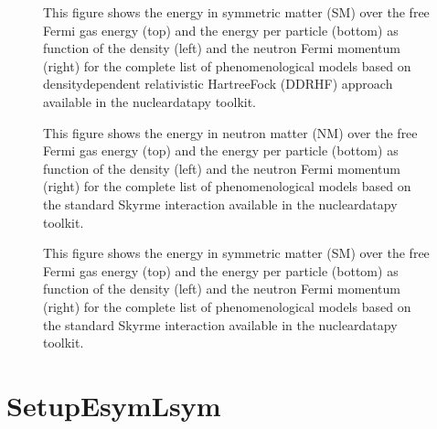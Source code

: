 \documentclass[letterpaper,10pt,english]{sphinxmanual}
\begin{document}
\begin{figure}[htbp]
\centering
\capstart

\noindent{}
\caption{This figure shows the energy in symmetric matter (SM) over the free Fermi gas energy (top) and the energy per particle (bottom) as function of the density (left) and the neutron Fermi momentum (right) for the complete list of phenomenological models based on density\sphinxhyphen{}dependent relativistic Hartree\sphinxhyphen{}Fock (DDRHF) approach available in the nucleardatapy toolkit.}\label{\detokenize{source/api/setup_pheno:id6}}\end{figure}

\begin{figure}[htbp]
\centering
\capstart

\noindent{}
\caption{This figure shows the energy in neutron matter (NM) over the free Fermi gas energy (top) and the energy per particle (bottom) as function of the density (left) and the neutron Fermi momentum (right) for the complete list of phenomenological models based on the standard Skyrme interaction available in the nucleardatapy toolkit.}\label{\detokenize{source/api/setup_pheno:id7}}\end{figure}

\begin{figure}[htbp]
\centering
\capstart

\noindent{}
\caption{This figure shows the energy in symmetric matter (SM) over the free Fermi gas energy (top) and the energy per particle (bottom) as function of the density (left) and the neutron Fermi momentum (right) for the complete list of phenomenological models based on the standard Skyrme interaction available in the nucleardatapy toolkit.}\label{\detokenize{source/api/setup_pheno:id8}}\end{figure}

\sphinxstepscope


\section{SetupEsymLsym}
\label{\detokenize{source/api/setup_EsymLsym:setupesymlsym}}\label{\detokenize{source/api/setup_EsymLsym::doc}}\label{\detokenize{source/api/setup_EsymLsym:module-nucleardatapy.setup_EsymLsym}}
\end{document}
